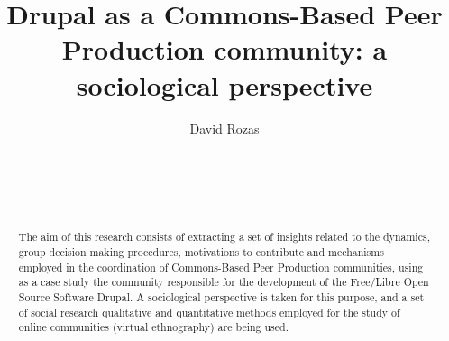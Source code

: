 \documentclass{sig-alternate}
\begin{document}

\title{Drupal as a Commons-Based Peer Production community: a sociological perspective}

\author{
%
%
\alignauthor
David Rozas\\
       \\
       \\
       \\
       \\     
}

\maketitle
\begin{abstract}
The aim of this research consists of extracting a set of insights related to the dynamics, group decision making procedures, motivations to contribute and mechanisms employed in the coordination of Commons-Based Peer Production communities, using as a case study the community responsible for the development of the Free/Libre Open Source Software Drupal. A sociological perspective is taken for this purpose, and a set of social research qualitative and quantitative methods employed for the study of online communities (virtual ethnography) are being used.  
\end{abstract}


\end{document}
